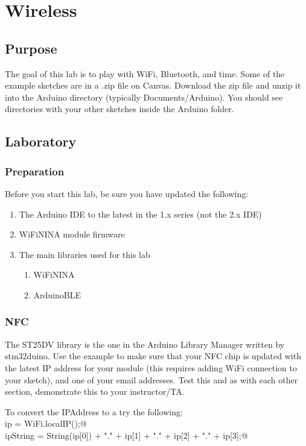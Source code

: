 \chapter{Wireless}

\section{Purpose}
The goal of this lab is to play with WiFi, Bluetooth, and time. Some of the example
sketches are in a .zip file on Canvas. Download the zip file and unzip it into the 
Arduino directory (typically Documents/Arduino). You should see directories with 
your other sketches inside the Arduino folder.

\section{Laboratory}
\subsection{Preparation}
Before you start this lab, be sure you have updated the following:
\begin{enumerate}
    \item The Arduino IDE to the latest in the 1.x series (not the 2.x IDE)
    \item WiFiNINA module firmware
    \item The main libraries used for this lab 
    \begin{enumerate}
        \item WiFiNINA
        \item ArduinoBLE
    \end{enumerate}
\end{enumerate}

\subsection{NFC}
The ST25DV library is the one in the Arduino Library Manager written by stm32duino.
Use the example to make sure that your NFC chip is updated with the latest
IP address for your module (this requires adding WiFi connection to your sketch), 
and one of your email addresses. Test this and as with each other section, 
demonstrate this to your instructor/TA.

To convert the IPAddress to a \lstinline@String@ try the following:\\
\lstinline@IPAddress ip = WiFi.localIP();@\\
\lstinline@String ipString = String(ip[0]) + "." + ip[1] + "." + ip[2] + "." + ip[3];@

